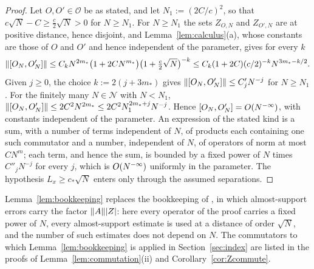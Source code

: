 \begin{proof}
Let $O,O'\in\mathcal O$ be as stated, and let $N_1:=(2C/c)^2$, so that $c\sqrt N-C\ge\frac c2\sqrt N>0$ for $N\ge N_1$.
For $N\ge N_1$ the sets $Z_{O,N}$ and $Z_{O',N}$ are at positive distance, hence disjoint, and
Lemma~\ref{lem:calculus}(a), whose constants are those of $O$ and $O'$ and hence independent of the parameter, gives
for every $k$
\[
\lVert[O_N,O'_N]\rVert\le C_kN^{2m_*}\bigl(1+2CN^{m_*}\bigr)\bigl(1+\tfrac c2\sqrt N\bigr)^{-k}\le C_k(1+2C)(c/2)^{-k}N^{3m_*-k/2}.
\]
Given $j\ge0$, the choice $k:=2(j+3m_*)$ gives $\lVert[O_N,O'_N]\rVert\le C'_jN^{-j}$ for $N\ge N_1$. For the finitely many
$N\in\mathcal N$ with $N<N_1$, $\lVert[O_N,O'_N]\rVert\le2C^2N^{2m_*}\le2C^2N_1^{2m_*+j}N^{-j}$. Hence $[O_N,O'_N]=O(N^{-\infty})$, with
constants independent of the parameter. An expression of the stated kind is a sum, with a number of terms independent
of $N$, of products each containing one such commutator and a number, independent of $N$, of operators of norm at most
$CN^m$; each term, and hence the sum, is bounded by a fixed power of $N$ times $C''_jN^{-j}$ for every $j$, which is
$O(N^{-\infty})$ uniformly in the parameter. The hypothesis $L_x\ge c_*\sqrt N$ enters only through the assumed separations.
\end{proof}

\begin{remark}\label{rem:bookkeeping}
Lemma~\ref{lem:bookkeeping} replaces the bookkeeping of \cite{BBDF21}, in which almost-support errors carry the
factor $\lVert A\rVert\lvert Z\rvert$: here every operator of the proof carries a fixed power of $N$, every almost-support
estimate is used at a distance of order $\sqrt N$, and the number of such estimates does not depend on $N$. The
commutators to which Lemma~\ref{lem:bookkeeping} is applied in Section~\ref{sec:index} are listed in the proofs of
Lemma~\ref{lem:commutation}(ii) and Corollary~\ref{cor:Zcommute}.
\end{remark}
